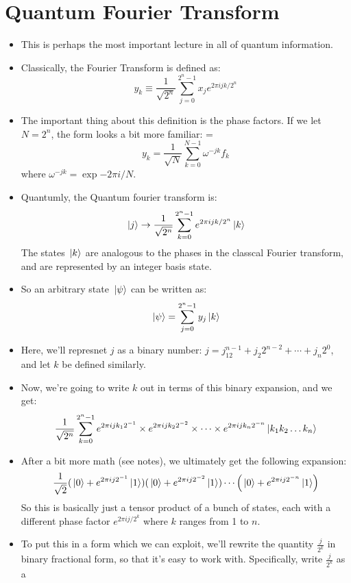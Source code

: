 \section{Quantum Fourier Transform}
\begin{itemize}
	\item This is perhaps the most important lecture in all of quantum information. 
	\item Classically, the Fourier Transform is defined as: 
		\[
		y_k \equiv \frac{1}{\sqrt{2^{n}} }\sum_{j = 0}^{2^{n} - 1} x_j e^{2 \pi i j k / 2^{n}}
		\] 
	\item The important thing about this definition is the phase factors. If we let \( N = 2^{n} \), the form 
		looks a bit more familiar: =
		\[
		y_k = \frac{1}{\sqrt{N} }\sum_{k = 0}^{N - 1} \omega^{-jk}f_k
		\] 
		where \( \omega^{-jk} = \exp{-2 \pi i /N} \). 
	\item Quantumly, the Quantum fourier transform is:
		\[
		\ket*{j} \to \frac{1}{\sqrt{2^{n}} }\sum_{k = 0}^{2^{n} - 1} e^{2 \pi i j k / 2^{n}} \ket*{k}
		\] 
		The states \( \ket*{k} \) are analogous to the phases in the classcal Fourier transform, and are represented by
		an integer basis state.
	\item So an arbitrary state \( \ket*{\psi} \) can be written as: 
		\[
		\ket*{\psi} = \sum_{j = 0}^{2^{n} - 1} y_j \ket*{k}
		\] 
	\item Here, we'll represnet \( j \) as a binary number: \( j = j_{12}^{n - 1} + j_2 2^{n - 2} + \cdots + 
		j_n 2^{0}\), and let \( k \) be defined similarly.
	\item Now, we're going to write \( k \) out in terms of this binary expansion, and we get:
		\[
		\frac{1}{\sqrt{2^{n}} }\sum_{k = 0}^{2^{n} - 1}e^{2 \pi i j k_1 2^{-1}} \times e^{2 \pi i j k_2 2^{-2}} \times 
		\cdots \times e^{2 \pi i j k_n 2^{-n}}\ket*{k_1k_2\dots k_n}
		\] 
	\item After a bit more math (see notes), we ultimately get the following expansion:
		\[
		\frac{1}{\sqrt{2} }(\ket*{0} + e^{2 \pi ij 2^{-1}}\ket*{1})(\ket*{0} + e^{2 \pi i j 2^{-2}}\ket*{1}) 
		\cdots \left( \ket*{0} + e^{2 \pi i j 2^{-n}}\ket*{1} \right) 
		\] 
		So this is basically just a tensor product of a bunch of states, each with a different phase 
		factor \( e^{2 \pi i j / 2^{k}} \) where \( k \) ranges from 1 to \( n \). 
	\item To put this in a form which we can exploit, we'll rewrite the quantity \( \frac{j}{2^{k}} \) in binary 
		fractional form, so that it's easy to work with. Specifically, write \( \frac{j}{2^{k}} \) as a 

\end{itemize}

